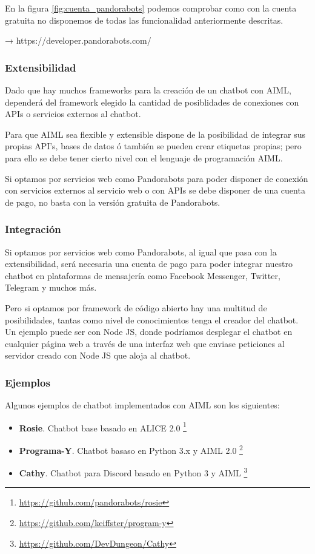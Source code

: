 En la figura \ref{fig:cuenta_pandorabots} podemos comprobar como con la cuenta gratuita no disponemos de todas las funcionalidad anteriormente descritas.


→ https://developer.pandorabots.com/


\subsubsection*{Extensibilidad}

Dado que hay muchos frameworks para la creación de un chatbot con AIML, dependerá del framework elegido la cantidad de posiblidades de conexiones con APIs o servicios externos al chatbot. 

Para que AIML sea flexible y extensible dispone de la posibilidad de integrar sus propias API's, bases de datos ó también se pueden crear etiquetas propias; pero para ello se debe tener cierto nivel con el lenguaje de programación AIML.

Si optamos por servicios web como Pandorabots para poder disponer de conexión con servicios externos al servicio web o con APIs se debe disponer de una cuenta de pago, no basta con la versión gratuita de Pandorabots.

\subsubsection*{Integración}

Si optamos por servicios web como Pandorabots, al igual que pasa con la extensibilidad, será necesaria una cuenta de pago para poder integrar nuestro chatbot en plataformas de mensajería como Facebook Messenger, Twitter, Telegram y muchos más.

Pero si optamos por framework de código abierto hay una multitud de posibilidades, tantas como nivel de conocimientos tenga el creador del chatbot. Un ejemplo puede ser con Node JS, donde podríamos desplegar el chatbot en cualquier página web a través de una interfaz web que enviase peticiones al servidor creado con Node JS que aloja al chatbot.

\subsubsection*{Ejemplos}

Algunos ejemplos de chatbot implementados con AIML son los siguientes:

\begin{itemize}
    \item \textbf{Rosie}. Chatbot base basado en ALICE 2.0 \footnote{\url{https://github.com/pandorabots/rosie}}
    \item \textbf{Programa-Y}. Chatbot basaso en Python 3.x y AIML 2.0 \footnote{\url{https://github.com/keiffster/program-y}}
    \item \textbf{Cathy}. Chatbot para Discord basado en Python 3 y AIML \footnote{\url{https://github.com/DevDungeon/Cathy}}
\end{itemize}


